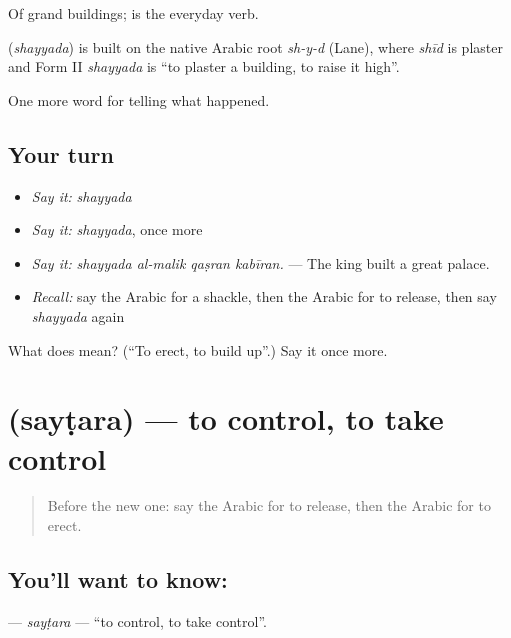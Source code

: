 Of grand buildings;  is the everyday verb.

\begin{cousinweb}
\textbf{} (\emph{shayyada}) is built on the native Arabic root \emph{sh-y-d} (Lane), where \emph{shīd} is plaster and Form II \emph{shayyada} is \textquotedblleft{}to plaster a building, to raise it high\textquotedblright{}.
\end{cousinweb}

\begin{grammarlens}[title={What you've built}]
One more word for telling what happened.
\end{grammarlens}

\subsection*{Your turn}
\begin{itemize}
\raggedright
  \item \emph{Say it:} \emph{shayyada}
  \item \emph{Say it:} \emph{shayyada}, once more
  \item \emph{Say it:} \emph{shayyada al-malik qaṣran kabīran.} — The king built a great palace.
  \item \emph{Recall:} say the Arabic for a shackle, then the Arabic for to release, then say \emph{shayyada} again
\end{itemize}

\begin{tcolorbox}[breakable,colback=teal!4,colframe=teal!35!black,title={Before you move on}]
What does  mean? (\textquotedblleft{}To erect, to build up\textquotedblright{}.) Say it once more.
\end{tcolorbox}
\section[\texorpdfstring{\ar{سيطر} (sayṭara)}{سيطر (sayṭara)}]{ (sayṭara) — to control, to take control}

\label{lesson:AR-C331-saytara}



\begin{quote}
Before the new one: say the Arabic for to release, then the Arabic for to erect.
\end{quote}

\subsection*{You'll want to know: }
\textbf{} — \emph{sayṭara} — \textquotedblleft{}to control, to take control\textquotedblright{}.

